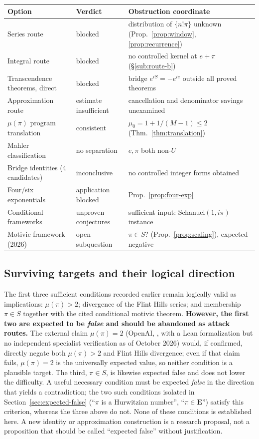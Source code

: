 \documentclass[11pt]{amsart}
\theoremstyle{definition}
\theoremstyle{remark}
\numberwithin{equation}{section}
\newcommand{\irr}{\mu}
\newcommand{\ee}{e}
\begin{document}
\begin{center}
\small\begin{tabularx}{\textwidth}{@{}p{}p{}X@{}}
\toprule
Option & Verdict & Obstruction coordinate \\
\midrule
Series route & blocked & distribution of $\{n!\pi\}$ unknown (Prop.~\ref{prop:window}, \ref{prop:recurrence}) \\
Integral route & blocked & no controlled kernel at $e+\pi$ (\S\ref{sub:route-b}) \\
Transcendence theorems, direct & blocked & bridge $\ee^{iS}=-\ee^{ie}$ outside all proved theorems \\
Approximation route & estimate insufficient & cancellation and denominator savings unexamined \\
$\irr(\pi)$ program translation & consistent & $\irr_0=1+1/(M-1)\le2$ (Thm.~\ref{thm:translation}) \\
Mahler classification & no separation & $\ee,\pi$ both non-$U$ \\
Bridge identities (4 candidates) & inconclusive & no controlled integer forms obtained \\
Four/six exponentials & application blocked & Prop.~\ref{prop:four-exp} \\
Conditional frameworks & unproven conjectures & sufficient input: Schanuel$(1,i\pi)$ instance \\
Motivic framework (2026) & open subquestion & $\pi\in S$? (Prop.~\ref{prop:scaling}), expected negative \\
\bottomrule
\end{tabularx}
\end{center}

\subsection{Surviving targets and their logical direction}

The first three sufficient conditions recorded earlier remain logically valid as implications: $\irr(\pi)>2$; divergence of the Flint Hills series; and membership $\pi\in S$ together with the cited conditional motivic theorem. \textbf{However, the first two are expected to be \emph{false} and should be abandoned as attack routes.} The external claim $\irr(\pi)=2$ (OpenAI, \cite{OpenAI2026}, with a Lean formalization but no independent specialist verification as of October 2026) would, if confirmed, directly negate both $\irr(\pi)>2$ and Flint Hills divergence; even if that claim fails, $\irr(\pi)=2$ is the universally expected value, so neither condition is a plausible target. The third, $\pi\in S$, is likewise expected false and does not lower the difficulty. A useful necessary condition must be expected \emph{false} in the direction that yields a contradiction; the two such conditions isolated in Section~\ref{sec:expected-false} (``$\pi$ is a Hurwitzian number'', ``$\pi\in\mathbf{E}$'') satisfy this criterion, whereas the three above do not. None of these conditions is established here. A new identity or approximation construction is a research proposal, not a proposition that should be called ``expected false'' without justification.
\end{document}
